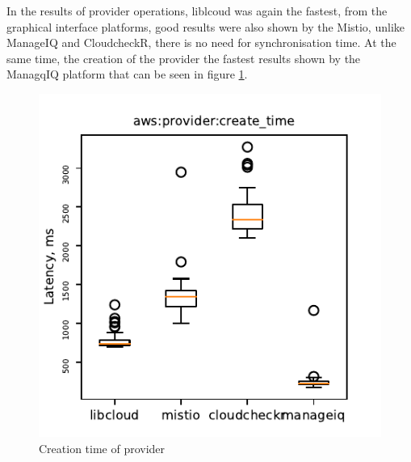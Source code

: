 In the results of provider operations, liblcoud was again the fastest, from the graphical interface platforms, good results were also shown by the Mistio, unlike ManageIQ and CloudcheckR, there is no need for synchronisation time. At the same time, the creation of the provider the fastest results shown by the ManagqIQ platform that can be seen in figure \ref{creti}.

\begin{figure}[htbp]
\centerline{\includegraphics[scale=1]{pics/provider_create_time.pdf}}
\caption{Creation time of provider}
\label{creti}
\end{figure}

